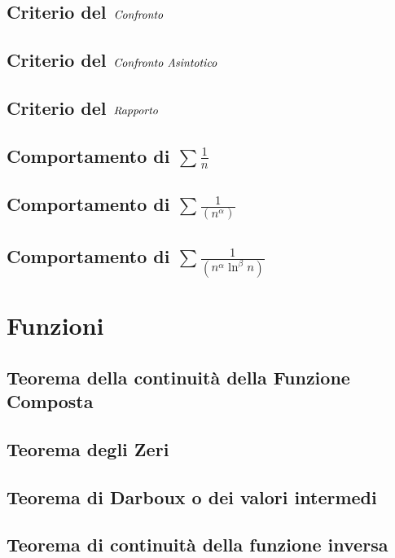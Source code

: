 \documentclass[11pt, a4paper]{book}
\begin{document}
\section{Criterio del $\emph{Confronto}$}
\section{Criterio del $\emph{Confronto Asintotico}$}
\section{Criterio del $\emph{Rapporto}$}
\section{Comportamento di $\sum\frac{1}{n}$}
\section{Comportamento di $\sum\frac{1}{(n^\alpha)}$}
\section{Comportamento di $\sum\frac{1}{(n^\alpha\ln^\beta n)}$}

\chapter{Funzioni}
\section{Teorema della continuità della Funzione Composta}
\section{Teorema degli Zeri}
\section{Teorema di Darboux o dei valori intermedi}
\section{Teorema di continuità della funzione inversa}
\end{document}
